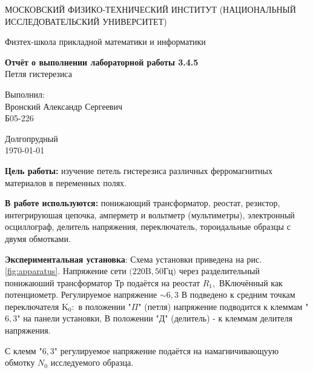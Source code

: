 \documentclass[a4paper,12pt]{article}
\date{\today}
\begin{document}
\begin{titlepage}
	\begin{center}
		{\large МОСКОВСКИЙ ФИЗИКО-ТЕХНИЧЕСКИЙ ИНСТИТУТ (НАЦИОНАЛЬНЫЙ ИССЛЕДОВАТЕЛЬСКИЙ УНИВЕРСИТЕТ)}
	\end{center}
	\begin{center}
		{\large Физтех-школа прикладной математики и информатики}
	\end{center}


	\vspace{4.5cm}
	{\huge
		\begin{center}
			{\bf Отчёт о выполнении лабораторной работы 3.4.5}\\
      Петля гистерезиса
		\end{center}
	}
	\vspace{2cm}
	\begin{flushright}
		{\LARGE Выполнил:\\ Вронский Александр Сергеевич \\
			\vspace{0.2cm}
			Б05-226}
	\end{flushright}
	\vspace{8cm}
	\begin{center}
		Долгопрудный\\
		\today
	\end{center}
\end{titlepage}

\textbf{Цель работы:} изучение петель гистерезиса различных ферромагнитных
материалов в переменных полях.

\textbf{В работе используются:} понижающий трансформатор, реостат, резистор, интегрируюшая цепочка, амперметр и вольтметр (мультиметры), электронный осциллограф, делитель напряжения, переключатель, тороидальные образцы с двумя обмотками.

\textbf{Экспериментальная установка}: Схема установки приведена на рис. \ref{fig:apparatus}. Напряжение сети $(220 \mathrm{B}, 50$Гц$)$ через разделительный понижаюший трансформатор Тр подаётся на реостат $R_{1},$ ВКлючённый как потенциометр. Регулируемое напряжение $\sim 6,3$ В подведено к средним точкам переключателя $\mathrm{K}_{0}:$ в положении "$\Pi$" (петля) напряжение подводится к клеммам "$6,3$" на панели установки, В положении "Д" (делитель) - к клеммам делителя напряжения.

С клемм "$6,3$" регулируемое напряжение подаётся на намагничивающуую обмотку $N_{0}$ исследуемого образца.
\end{document}
